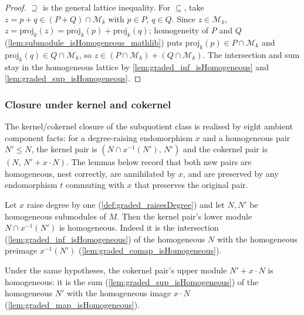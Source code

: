 \begin{proof}
    \leanok
  \(\supseteq\) is the general lattice inequality. For \(\subseteq\), take \(z = p +
  q \in (P + Q) \cap \mathcal{M}_k\) with \(p \in P\), \(q \in Q\). Since \(z \in
  \mathcal{M}_k\), \(z = \mathrm{proj}_k(z) = \mathrm{proj}_k(p) +
  \mathrm{proj}_k(q)\); homogeneity of \(P\) and \(Q\)
  (\cref{lem:submodule_isHomogeneous_mathlib}) puts \(\mathrm{proj}_k(p) \in P \cap
  \mathcal{M}_k\) and \(\mathrm{proj}_k(q) \in Q \cap \mathcal{M}_k\), so \(z \in (P
  \cap \mathcal{M}_k) + (Q \cap \mathcal{M}_k)\). The intersection and sum stay in
  the homogeneous lattice by \cref{lem:graded_inf_isHomogeneous} and
  \cref{lem:graded_sup_isHomogeneous}.
\end{proof}

\subsubsection*{Closure under kernel and cokernel}

The kernel/cokernel closure of the subquotient class is realised by eight ambient
component facts: for a degree-raising endomorphism \(x\) and a homogeneous pair
\(N' \le N\), the kernel pair is \((N \cap x^{-1}(N'),\, N')\) and the cokernel pair is
\((N,\, N' + x \cdot N)\). The lemmas below record that both new pairs are homogeneous,
nest correctly, are annihilated by \(x\), and are preserved by any endomorphism \(t\)
commuting with \(x\) that preserves the original pair.

\begin{lemma}\leanok
  \label{lem:graded_ker_isHomogeneous}
  Let \(x\) raise degree by one (\cref{def:graded_raisesDegree}) and let \(N, N'\) be
  homogeneous submodules of \(M\). Then the kernel pair's lower module
  \(N \cap x^{-1}(N')\) is homogeneous. Indeed it is the intersection
  (\cref{lem:graded_inf_isHomogeneous}) of the homogeneous \(N\) with the homogeneous
  preimage \(x^{-1}(N')\) (\cref{lem:graded_comap_isHomogeneous}).
\end{lemma}

\begin{lemma}\leanok
  \label{lem:graded_coker_isHomogeneous}
  Under the same hypotheses, the cokernel pair's upper module \(N' + x \cdot N\) is
  homogeneous: it is the sum (\cref{lem:graded_sup_isHomogeneous}) of the homogeneous
  \(N'\) with the homogeneous image \(x \cdot N\)
  (\cref{lem:graded_map_isHomogeneous}).
\end{lemma}

